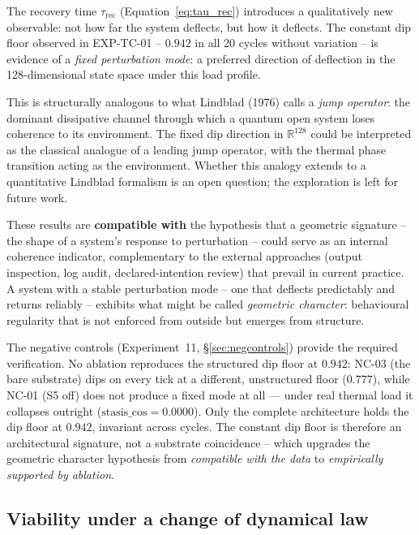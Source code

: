 \documentclass[11pt, a4paper]{article}
\begin{document}
The recovery time $\tau_\text{rec}$ (Equation~\ref{eq:tau_rec}) introduces a
qualitatively new observable: not how far the system deflects, but how it
deflects.  The constant dip floor observed in EXP-TC-01 -- $0.942$ in all 20
cycles without variation -- is evidence of a \emph{fixed perturbation mode}: a
preferred direction of deflection in the 128-dimensional state space under this
load profile.

This is structurally analogous to what Lindblad (1976) calls a \emph{jump
operator}: the dominant dissipative channel through which a quantum open system
loses coherence to its environment.  The fixed dip direction in $\mathbb{R}^{128}$ could
be interpreted as the classical analogue of a leading jump operator, with the
thermal phase transition acting as the environment.
Whether this analogy extends to a quantitative Lindblad formalism is an open
question; the exploration is left for future work.

These results are \textbf{compatible with} the hypothesis that a geometric
signature -- the shape of a system's response to perturbation -- could serve
as an internal coherence indicator, complementary to the external approaches
(output inspection, log audit, declared-intention review) that prevail in
current practice.
A system with a stable perturbation mode -- one that deflects predictably and
returns reliably -- exhibits what might be called \emph{geometric character}:
behavioural regularity that is not enforced from outside but emerges from
structure.

The negative controls (Experiment~11, \S\ref{sec:negcontrols}) provide the
required verification.
No ablation reproduces the structured dip floor at $0.942$: NC-03 (the bare
substrate) dips on every tick at a different, unstructured floor ($0.777$),
while NC-01 (S5 off) does not produce a fixed mode at all --- under real thermal
load it collapses outright ($\text{stasis\_cos}=0.0000$).
Only the complete architecture holds the dip floor at $0.942$, invariant
across cycles.
The constant dip floor is therefore an architectural signature, not a substrate
coincidence -- which upgrades the geometric character hypothesis from
\emph{compatible with the data} to \emph{empirically supported by ablation}.

\subsection{Viability under a change of dynamical law}
\label{sec:trustlaw}
\end{document}
